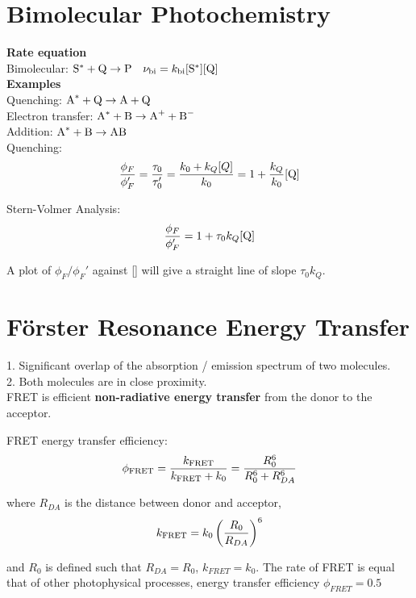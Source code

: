 \section{Bimolecular Photochemistry}
\textbf{Rate equation} \\
Bimolecular: $\ce{S}^{*} + \ce{Q} \rightarrow \ce{P} \quad \nu_{\mathrm{bi}} = k_{\mathrm{bi}} [\ce{S}^{*}][\ce{Q}]$\\

\textbf{Examples} \\
Quenching: $\ce{A^*} + \ce{Q} \rightarrow \ce{A} + \ce{Q}$ \\
Electron transfer: $\ce{A^*} + \ce{B} \rightarrow \ce{A+} + \ce{B-}$ \\
Addition: $\ce{A^*} + \ce{B} \rightarrow \ce{AB}$ \\

Quenching:
\begin{equation*}
  \frac{\phi_{F}}{\phi_{F}'} = \frac{\tau_0}{\tau_0'} = \frac{k_0 + k_Q[Q]}{k_0} = 1 + \frac{k_Q}{k_0}[\ce{Q}]
\end{equation*}

Stern-Volmer Analysis:
$$\frac{\phi_F}{\phi_F'} = 1 + \tau_0 k_Q[\ce{Q}]$$

A plot of $\phi_F/\phi_F'$ against [] will give a straight line of slope $\tau_0 k_Q$.
\vspace{\baselineskip}

\section{Förster Resonance Energy Transfer}
1. Significant overlap of the absorption / emission spectrum of two molecules. \\
2. Both molecules are in close proximity. \\
FRET is efficient \textbf{non-radiative energy transfer} from the donor to the acceptor.
\vspace{\baselineskip}

FRET energy transfer efficiency:
$$\phi_{\ce{FRET}} = \frac{k_{\ce{FRET}}}{k_{\ce{FRET}}+k_0} = \frac{R_0^6}{R_0^6+R_{DA}^6}$$

where $R_{DA}$ is the distance between donor and acceptor, 
\columnbreak
$$k_{\ce{FRET}} = k_0 \left( \frac{R_0}{R_{DA}} \right)^6$$

and $R_0$ is defined such that $R_{DA} = R_0$, $k_{FRET} = k_0.$ The rate of FRET is equal that of other photophysical processes, energy transfer efficiency $\phi_{FRET} = 0.5$
\vspace{\baselineskip}

